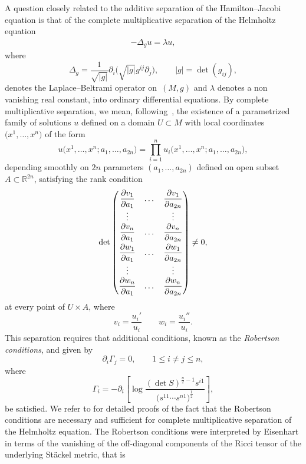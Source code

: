  A question closely related to the additive separation of the Hamilton--Jacobi equation is that of the complete multiplicative separation of the Helmholtz equation
 \begin{gather}\label{Helm}
-\Delta_{g} u =\lambda u,
\end{gather}
where
\[
\Delta_{g} = \frac{1}{\sqrt{|g|}}\partial_{i}\Big(\sqrt{|g|}g^{ij}\partial_{j}\Big),\qquad |g|=\det(g_{ij}),
\]
denotes the Laplace--Beltrami operator on~$(M,g)$ and $\lambda$ denotes a non vanishing real constant, into ordinary differential equations. By complete multiplicative separation, we mean, follo\-wing~\cite{BCR1-2002}, the existence of a parametrized family of solutions $u$ defined on a domain $U\subset M$ with local coordinates $\big(x^{1},\dots, x^{n}\big)$ of the form
\[
u\big(x^{1},\dots, x^{n};a_{1},\dots, a_{2n}\big)=\prod_{i=1}^{n}u_{i}\big(x^{1},\dots, x^{n};a_{1},\dots, a_{2n}\big),
\]
depending smoothly on $2n$ parameters $(a_{1},\dots, a_{2n})$ defined on open subset $A\subset {\mathbb R}^{2n}$, satisfying the rank condition
\begin{gather*}%
\det \left(
\begin{matrix}
\dfrac{\partial v_{1}}{\partial a_{1}}&\dots&\dfrac{\partial v_{1}}{\partial a_{2n}} \\
\vdots& & \vdots \\
\dfrac{\partial v_{n}}{\partial a_{1}}&\dots&\dfrac {\partial v_{n}}{\partial a_{2n}}\vspace{1mm}\\
\dfrac{\partial w_{1}}{\partial a_{1}}&\dots&\dfrac{\partial w_{1}}{\partial a_{2n}} \\
\vdots& & \vdots \\
\dfrac{\partial w_{n}}{\partial a_{1}}&\dots&\dfrac {\partial w_{n}}{\partial a_{2n}}
\end{matrix}
\right) \neq 0,
\end{gather*}
at every point of $U\times A$, where
\[
v_{i}=\frac{u_{i}'}{u_{i}} \qquad w_{i}=\frac{u_{i}''}{u_{i}}.
\]
This separation requires that additional conditions, known as the {\emph{Robertson conditions}}, and given by
\[
\partial_{i}\Gamma_{j}=0,\qquad 1\leq i\neq j\leq n,
\]
where
\[
\Gamma_{i}=-\partial_{i}\left[\log \frac{(\det S)^{\frac{n}{2}-1}s^{i1}}{\big(s^{11}\cdots s^{n1}\big)^{\frac{1}{2}}}\right],
\]
be satisfied. We refer to \cite{BCR1-2002,BCR2-2002,Eis1934,KaMi1980,KaMi1981,Rob1928} for detailed proofs of the fact that the Robertson conditions are necessary and sufficient for complete multiplicative separation of the Helmholtz equation. The Robertson conditions were interpreted by Eisenhart \cite{Eis1934} in terms of the vanishing of the off-diagonal components of the Ricci tensor of the underlying St\"ackel metric, that is
